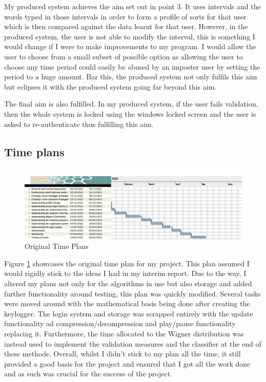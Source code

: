\documentclass[10pt,a4paper]{report}
\begin{document}
My produced system achieves the aim set out in point 3. It uses intervals and the words typed in those intervals in order to form a profile of sorts for that user which is then compared against the data learnt for that user. However, in the produced system, the user is not able to modify the interval, this is something I would change if I were to make improvements to my program. I would allow the user to choose from a small subset of possible option as allowing the user to choose any time period could easily be abused by an imposter user by setting the period to a huge amount. Bar this, the produced system not only fulfils this aim but eclipses it with the produced system going far beyond this aim.

The final aim is also fulfilled. In my produced system, if the user fails validation, then the whole system is locked using the windows locked screen and the user is asked to re-authenticate thus fulfilling this aim.


\subsection{Time plans}

\begin{figure}[h]
	\centering
	\includegraphics[scale=0.27]{GantChartAll}
	\caption{Original Time Plans}
	\label{fig:GAll}
\end{figure}

Figure \ref{fig:GAll} showcases the original time plan for my project. This plan assumed I would rigidly stick to the ideas I had in my interim report. Due to the way, I altered my plans not only for the algorithms in use but also storage and added further functionality around testing, this plan was quickly modified. Several tasks were moved around with the mathematical basis being done after creating the keylogger. The login system and storage was scrapped entirely with the update functionality ad compression/decompression and play/pause functionality replacing it. Furthermore, the time allocated to the Wigner distribution was instead used to implement the validation measures and the classifier at the end of these methods. Overall, whilst I didn't stick to my plan all the time, it still provided a good basis for the project and ensured that I got all the work done and as such was crucial for the success of the project.
\end{document}
